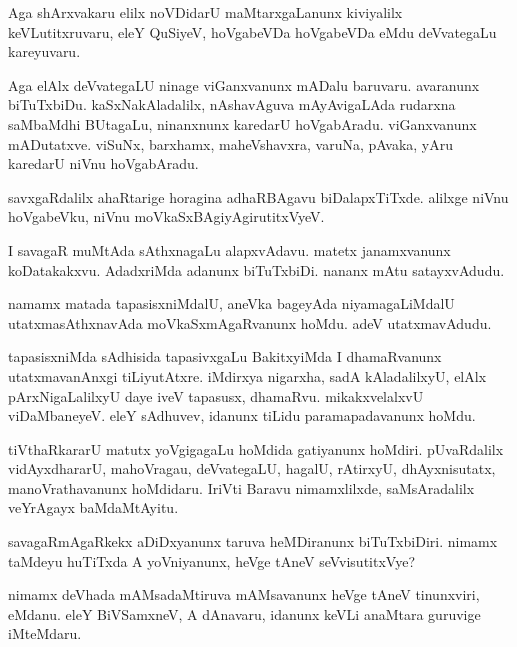 \documentclass{article}
\begin{document}
\begin{mn}
Aga shArxvakaru elilx noVDidarU maMtarxgaLanunx kiviyalilx
keVLutitxruvaru, eleY QuSiyeV, hoVgabeVDa hoVgabeVDa eMdu deVvategaLu kareyuvaru.
\end{mn}

\begin{mn}
Aga elAlx deVvategaLU ninage viGanxvanunx mADalu baruvaru. avaranunx
biTuTxbiDu. kaSxNakAladalilx, nAshavAguva mAyAvigaLAda rudarxna
saMbaMdhi BUtagaLu, ninanxnunx karedarU hoVgabAradu. viGanxvanunx
mADutatxve. viSuNx, barxhamx, maheVshavxra, varuNa, pAvaka, yAru
karedarU niVnu hoVgabAradu.
\end{mn}

\begin{mn}
savxgaRdalilx ahaRtarige horagina adhaRBAgavu biDalapxTiTxde. alilxge
niVnu hoVgabeVku, niVnu moVkaSxBAgiyAgirutitxVyeV.
\end{mn}

\begin{mn}
I savagaR muMtAda sAthxnagaLu alapxvAdavu. matetx janamxvanunx
koDatakakxvu. AdadxriMda adanunx biTuTxbiDi. nananx mAtu satayxvAdudu.
\end{mn}

\begin{mn}
namamx matada tapasisxniMdalU, aneVka bageyAda niyamagaLiMdalU
utatxmasAthxnavAda moVkaSxmAgaRvanunx hoMdu. adeV utatxmavAdudu.
\end{mn}

\begin{mn}
tapasisxniMda sAdhisida tapasivxgaLu BakitxyiMda I dhamaRvanunx
utatxmavanAnxgi tiLiyutAtxre. iMdirxya nigarxha, sadA kAladalilxyU,
elAlx pArxNigaLalilxyU daye iveV tapasusx, dhamaRvu. mikakxvelalxvU
viDaMbaneyeV. eleY sAdhuvev, idanunx tiLidu paramapadavanunx hoMdu.
\end{mn}

\begin{mn}%
tiVthaRkararU matutx yoVgigagaLu hoMdida gatiyanunx
hoMdiri. pUvaRdalilx vidAyxdhararU, mahoVragau, deVvategaLU, hagalU,
rAtirxyU, dhAyxnisutatx, manoVrathavanunx hoMdidaru. IriVti Baravu
nimamxlilxde, saMsAradalilx veYrAgayx baMdaMtAyitu.
\end{mn}

\begin{mn}
savagaRmAgaRkekx aDiDxyanunx taruva heMDiranunx biTuTxbiDiri. nimamx
taMdeyu huTiTxda A yoVniyanunx, heVge tAneV seVvisutitxVye?
\end{mn}

\begin{mn}
nimamx deVhada mAMsadaMtiruva mAMsavanunx heVge tAneV tinunxviri,
eMdanu. eleY BiVSamxneV, A dAnavaru, idanunx keVLi anaMtara guruvige iMteMdaru.
\end{mn}
\end{document}
